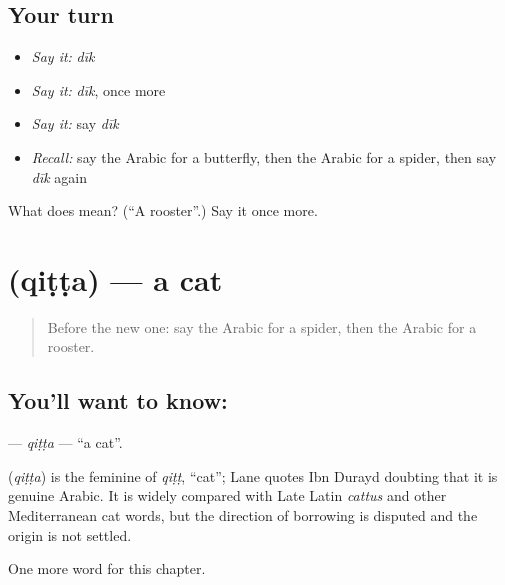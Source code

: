 \subsection*{Your turn}
\begin{itemize}
\raggedright
  \item \emph{Say it:} \emph{dīk}
  \item \emph{Say it:} \emph{dīk}, once more
  \item \emph{Say it:} say \emph{dīk}
  \item \emph{Recall:} say the Arabic for a butterfly, then the Arabic for a spider, then say \emph{dīk} again
\end{itemize}

\begin{tcolorbox}[breakable,colback=teal!4,colframe=teal!35!black,title={Before you move on}]
What does  mean? (\textquotedblleft{}A rooster\textquotedblright{}.) Say it once more.
\end{tcolorbox}
\section[\texorpdfstring{\ar{قطة} (qiṭṭa)}{قطة (qiṭṭa)}]{ (qiṭṭa) — a cat}

\label{lesson:AR-C137-qitta}



\begin{quote}
Before the new one: say the Arabic for a spider, then the Arabic for a rooster.
\end{quote}

\subsection*{You'll want to know: }
\textbf{} — \emph{qiṭṭa} — \textquotedblleft{}a cat\textquotedblright{}.

\begin{cousinweb}
\textbf{} (\emph{qiṭṭa}) is the feminine of \emph{qiṭṭ}, \textquotedblleft{}cat\textquotedblright{}; Lane quotes Ibn Durayd doubting that it is genuine Arabic. It is widely compared with Late Latin \emph{cattus} and other Mediterranean cat words, but the direction of borrowing is disputed and the origin is not settled.
\end{cousinweb}

\begin{grammarlens}[title={What you've built}]
One more word for this chapter.
\end{grammarlens}

